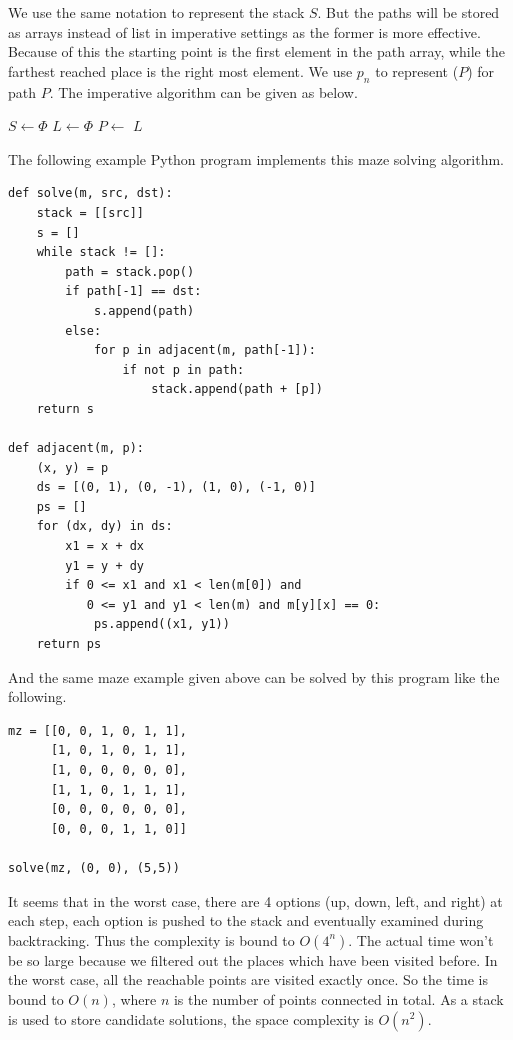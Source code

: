 \documentclass[UTF8]{article}
\begin{document}
We use the same notation to represent the stack $S$. But the paths will be stored as arrays
instead of list in imperative settings as the former is more effective. Because of this
the starting point is the first element in the path array, while the farthest reached
place is the right most element. We use $p_n$ to represent ($P$) for
path $P$. The imperative algorithm can be given as below.

\begin{algorithmic}[1]
  \State $S \gets \Phi$
  \State {}
  \State $L \gets \Phi$ 
    \State $P \gets$ 
      \State {}
    \Else
          \State {}
        \EndIf
      \EndFor
    \EndIf
  \EndWhile
  \State \Return $L$
\EndFunction
\end{algorithmic}

The following example Python program implements this maze solving algorithm.

\lstset{language=Python}
\begin{lstlisting}
def solve(m, src, dst):
    stack = [[src]]
    s = []
    while stack != []:
        path = stack.pop()
        if path[-1] == dst:
            s.append(path)
        else:
            for p in adjacent(m, path[-1]):
                if not p in path:
                    stack.append(path + [p])
    return s

def adjacent(m, p):
    (x, y) = p
    ds = [(0, 1), (0, -1), (1, 0), (-1, 0)]
    ps = []
    for (dx, dy) in ds:
        x1 = x + dx
        y1 = y + dy
        if 0 <= x1 and x1 < len(m[0]) and
           0 <= y1 and y1 < len(m) and m[y][x] == 0:
            ps.append((x1, y1))
    return ps
\end{lstlisting}

And the same maze example given above can be solved by this program like the following.

\lstset{language=Python}
\begin{lstlisting}
mz = [[0, 0, 1, 0, 1, 1],
      [1, 0, 1, 0, 1, 1],
      [1, 0, 0, 0, 0, 0],
      [1, 1, 0, 1, 1, 1],
      [0, 0, 0, 0, 0, 0],
      [0, 0, 0, 1, 1, 0]]

solve(mz, (0, 0), (5,5))
\end{lstlisting}

It seems that in the worst case, there are 4 options (up, down, left, and right) at
each step, each option is pushed to the stack and eventually examined during backtracking.
Thus the complexity is bound to $O(4^n)$. The actual time won't be so large
because we filtered out the places which have been visited before.
In the worst case, all the reachable
points are visited exactly once. So the time is bound to $O(n)$, where $n$ is the
number of points connected in total. As a stack is used to store candidate solutions,
the space complexity is $O(n^2)$.
\end{document}
